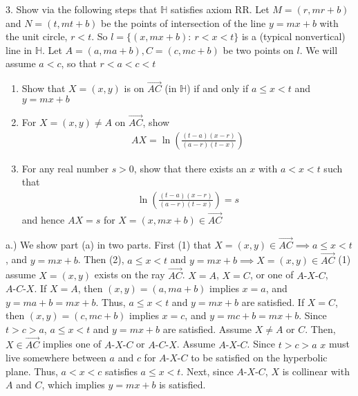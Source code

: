 \documentclass{report}
\begin{document}
    
    \pagebreak \bigbreak \noindent 
    \begin{mdframed}
        3. Show via the following steps that $\mathbb{H}$ satisfies axiom RR.
        \bigbreak \noindent 
        Let $M = (r, mr+b)$ and $N = (t, mt+b)$ be the points of intersection of the line $ y=mx+b$ with the unit circle, $r < t$. So $l = \{(x,mx+b):\ r < x < t\} $ is a (typical nonvertical) line in $\mathbb{H}$. Let $A = (a,ma+b), C = (c,mc+b)$ be two points on $l$. We will assume $a<c$, so that $r<a<c<t$
        \begin{enumerate}[label=(\alph*)]
            \item Show that $X = (x,y)$ is on $\overrightarrow{AC} $ (in $\mathbb{H}$) if and only if $a \leq x < t$ and $y=mx+b$
            \item For $X = (x,y) \ne A$ on $\overrightarrow{AC}$, show 
                \begin{align*}
                    AX = \ln{\left(\frac{(t-a)(x-r)}{(a-r)(t-x)}\right)}
                \end{align*}
            \item For any real number $s > 0 $, show that there exists an $x$ with $ a < x < t$ such that
                \begin{align*}
                    \ln{\left(\frac{(t-a)(x-r)}{(a-r)(t-x)}\right)} = s
                \end{align*}
                and hence $AX  = s$ for $X = (x,mx+b) \in \overrightarrow{AC}$
        \end{enumerate}
    \end{mdframed}
    \bigbreak \noindent 
    a.) We show part (a) in two parts. First (1) that $X = (x,y) \in \overrightarrow{AC}  \implies a \leq x < t$, and $y = mx+b$. Then (2), $a \leq x < t$ and $y = mx+b  \implies X = (x,y) \in \overrightarrow{AC}$
    \bigbreak \noindent 
    (1) assume $X = (x,y)$ exists on the ray $\overrightarrow{AC}$. $X = A$, $X = C$, or one of $ A\text{-}X\text{-}C$, $ A\text{-}C\text{-}X$. If $X = A$, then $(x,y) = (a, ma+b)$ implies $x =a$, and $y = ma +b = mx + b$. Thus, $a \leq x < t$ and $y = mx+b$ are satisfied. If $X = C$, then $(x,y) = (c, mc+b)$ implies $x = c$, and $y = mc + b = mx + b$. Since $t > c > a$, $a \leq x < t$ and $y=mx+b$ are satisfied.
    \bigbreak \noindent 
    Assume $X \ne A$ or $C$. Then, $X \in \overrightarrow{AC}$ implies one of $ A\text{-}X\text{-}C$ or $ A\text{-}C\text{-}X$. Assume $ A\text{-}X\text{-}C$. Since $ t> c > a$ $x$ must live somewhere between $a$ and $c$ for $ A\text{-}X\text{-}C $ to be satisfied on the hyperbolic plane. Thus, $ a < x < c$ satisfies $a \leq x < t$. Next, since $ A\text{-}X\text{-}C$, $X$ is collinear with $A$ and $C$, which implies $y = mx+b$ is satisfied.
\end{document}
